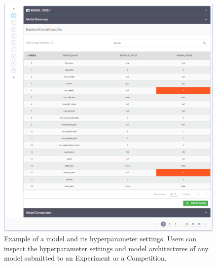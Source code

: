 \begin{figure}[h!]
  \centering
  \includegraphics[width=1\textwidth]{figures/model.png}
  \caption{Example of a model and its hyperparameter settings. Users can inspect the hyperparameter settings and model architectures of any model submitted to an Experiment or a Competition.}
\end{figure}